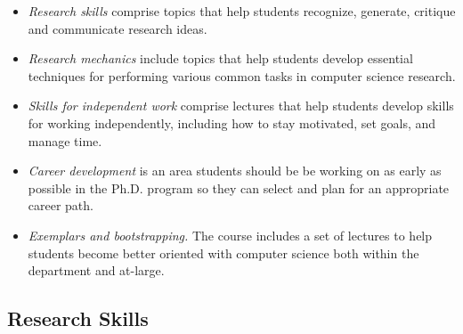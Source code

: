 \begin{itemize}
\itemsep=-1pt
\item {\em Research skills} comprise topics that help students
  recognize, generate, critique and communicate research ideas.
\item {\em Research mechanics} include topics that help students develop
  essential techniques for performing various common tasks in computer
  science research.
\item {\em Skills for independent work} comprise lectures that help
  students develop skills for working independently, including how to stay
  motivated, set goals, and manage time.
\item {\em Career development} is an area students should be be working
  on as early as possible in the Ph.D. program so they can select and
  plan for an appropriate career path.
\item {\em Exemplars and bootstrapping.} The course includes a set of
  lectures to help students become better oriented with computer science
  both within the department and at-large.
\end{itemize}

\subsection{Research Skills}

